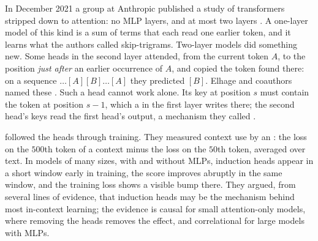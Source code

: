 \begin{refsection}
In December 2021 a group at Anthropic published a study of transformers stripped down to attention: no MLP layers, and at most two layers \parencite{ElhageEtAl2021}. A one-layer model of this kind is a sum of terms that each read one earlier token, and it learns what the authors called skip-trigrams. Two-layer models did something new. Some heads in the second layer attended, from the current token $A$, to the position \emph{just after} an earlier occurrence of $A$, and copied the token found there: on a sequence $\dots[A][B]\dots[A]$ they predicted $[B]$. Elhage and coauthors named these . Such a head cannot work alone. Its key at position $s$ must contain the token at position $s-1$, which a  in the first layer writes there; the second head's keys read the first head's output, a mechanism they called .

\Textcite{OlssonEtAl2022} followed the heads through training. They measured context use by an : the loss on the $500$th token of a context minus the loss on the $50$th token, averaged over text. In models of many sizes, with and without MLPs, induction heads appear in a short window early in training, the score improves abruptly in the same window, and the training loss shows a visible bump there. They argued, from several lines of evidence, that induction heads may be the mechanism behind most in-context learning; the evidence is causal for small attention-only models, where removing the heads removes the effect, and correlational for large models with MLPs.



\end{refsection}
